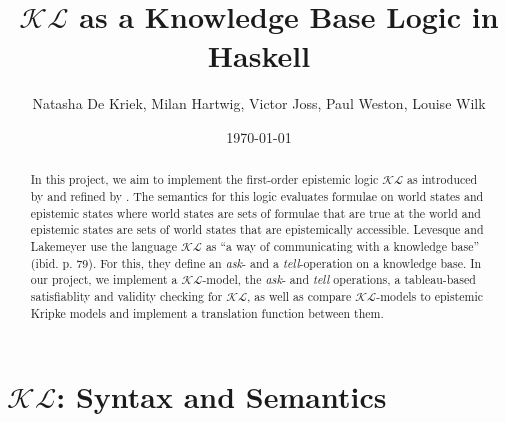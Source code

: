 \documentclass[12pt,a4paper]{article}
\title{$\mathcal{KL}$ as a Knowledge Base Logic in Haskell}
\author{Natasha De Kriek, Milan Hartwig, Victor Joss, Paul Weston, Louise Wilk}
\date{\today}
\begin{document}
\maketitle

\begin{abstract}
In this project, we aim to implement the first-order epistemic logic $\mathcal{KL}$ as introduced by \textcite{levesque1981} and refined by \textcite{Lokb}. 
The semantics for this logic evaluates formulae on world states and epistemic states where world states are sets of formulae that are true at the world and epistemic states are sets of world states that are epistemically accessible. Levesque and Lakemeyer use the language $\mathcal{KL}$ as ``a way of communicating with a knowledge base'' (ibid. p. 79). For this, they define an \emph{ask}- and a \emph{tell}-operation on a knowledge base. In our project, we implement a  $\mathcal{KL}$-model, the \emph{ask}- and \emph{tell} operations, a tableau-based satisfiablity and validity checking for  $\mathcal{KL}$, as well as compare  $\mathcal{KL}$-models to epistemic Kripke models and implement a translation function between them.
\end{abstract}


\tableofcontents

\clearpage



\section{\texorpdfstring{$\mathcal{KL}$}{KL}: Syntax and Semantics}\label{sec:KLmodel}





















\printbibliography
\end{document}
